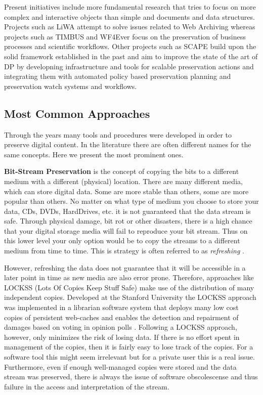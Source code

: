 Present initiatives include more fundamental research that tries to focus on more complex and interactive objects than simple and documents and data structures. Projects such as LiWA attempt to solve issues related to Web Archiving whereas projects such as TIMBUS and WF4Ever focus on the preservation of business processes and scientific workflows.
Other projects such as SCAPE build upon the solid framework established in the past and aim to improve the state of the art of DP by developning infrastructure and tools for scalable preservation actions and integrating them with automated policy based preservation planning and preservation watch systems and workflows.
\subsection{Most Common Approaches}
Through the years many tools and procedures were developed in order to preserve digital content. In the literature there are often different names for the same concepts. Here we present the most prominent ones. \newline

\textbf{Bit-Stream Preservation}
is the concept of copying the bits to a different medium with a different (physical) location. There are many different media, which can store digital data. Some are more stable than others, some are more popular than others. No matter on what type of medium you choose to store your data, CDs, DVDs, HardDrives, etc. it is not guaranteed that the data stream is safe. Through physical damage, bit rot or other disasters, there is a high chance that your digital storage media will fail to reproduce your bit stream. Thus on this lower level your only option would be to copy the streams to a different medium from time to time. This is strategy is often referred to as \textit{refreshing} \cite{Lee:2002:SOTADP}.

However, refreshing the data does not guarantee that it will be accessible in a later point in time as new media are also error prone. Therefore, approaches like LOCKSS (Lots Of Copies Keep Stuff Safe) make use of the distribution of many independent copies. Developed at the Stanford University the LOCKSS approach was implemented in a librarian software system that deploys many low cost copies of persistent web-caches and enables the detection and repairment of damages based on voting in opinion polls \cite{reich2001lpw, Maniatis:2003:PPR:1165389.945451}.
Following a LOCKSS approach, however, only minimizes the risk of losing data. If there is no effort spent in management of the copies, then it is fairly easy to lose track of the copies. For a software tool this might seem irrelevant but for a private user this is a real issue. Furthermore, even if enough well-managed copies were stored and the data stream was preserved, there is always the issue of software obscolescense and thus failure in the access and interpretation of the stream. \newline


